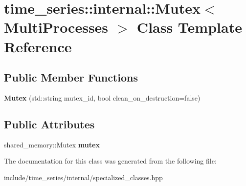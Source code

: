 \hypertarget{classtime__series_1_1internal_1_1Mutex_3_01MultiProcesses_01_4}{}\section{time\+\_\+series\+:\+:internal\+:\+:Mutex$<$ Multi\+Processes $>$ Class Template Reference}
\label{classtime__series_1_1internal_1_1Mutex_3_01MultiProcesses_01_4}
\subsection*{Public Member Functions}
\begin{DoxyCompactItemize}
\item 
{\bfseries Mutex} (std\+::string mutex\+\_\+id, bool clean\+\_\+on\+\_\+destruction=false)\hypertarget{classtime__series_1_1internal_1_1Mutex_3_01MultiProcesses_01_4_af419ba3f8e8d32545934adc61b2c5912}{}\label{classtime__series_1_1internal_1_1Mutex_3_01MultiProcesses_01_4_af419ba3f8e8d32545934adc61b2c5912}

\end{DoxyCompactItemize}
\subsection*{Public Attributes}
\begin{DoxyCompactItemize}
\item 
shared\+\_\+memory\+::\+Mutex {\bfseries mutex}\hypertarget{classtime__series_1_1internal_1_1Mutex_3_01MultiProcesses_01_4_a1e95015e916cf7bc892fcce0f05be705}{}\label{classtime__series_1_1internal_1_1Mutex_3_01MultiProcesses_01_4_a1e95015e916cf7bc892fcce0f05be705}

\end{DoxyCompactItemize}


The documentation for this class was generated from the following file\+:\begin{DoxyCompactItemize}
\item 
include/time\+\_\+series/internal/specialized\+\_\+classes.\+hpp\end{DoxyCompactItemize}
